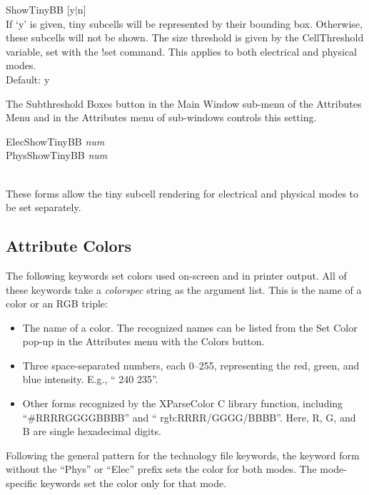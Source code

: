 \begin{description}
\item{\vt ShowTinyBB} [{\vt y}$|${\vt n}]\\
If `y' is given, tiny subcells will be represented by their bounding
box.  Otherwise, these subcells will not be shown.  The size threshold
is given by the {\et CellThreshold} variable, set with the {\cb !set}
command.  This applies to both electrical and physical modes.\\
Default: {\vt y}

The {\cb Subthreshold Boxes} button in the {\cb Main Window} sub-menu
of the {\cb Attributes Menu} and in the {\cb Attributes} menu of
sub-windows controls this setting.

\item\parbox[b]{4in}{\vt
ElecShowTinyBB {\it num}\\
PhysShowTinyBB {\it num}}\\
These forms allow the tiny subcell rendering for electrical and
physical modes to be set separately.
\end{description}


\subsection{Attribute Colors}
\label{attrcolor}

The following keywords set colors used on-screen and in printer
output.  All of these keywords take a {\it colorspec} string as the
argument list.  This is the name of a color or an RGB triple:

\begin{itemize}
\item{The name of a color.  The recognized names can be listed from
   the {\cb Set Color} pop-up in the {\cb Attributes} menu with the
   {\cb Colors} button.}
\item{Three space-separated numbers, each 0--255, representing the
   red, green, and blue intensity.  E.g., ``{ 240 235}''.}
\item{Other forms recognized by the {\vt XParseColor} C library
   function, including\\ ``{\vt \#RRRRGGGGBBBB}'' and ``{\vt
   rgb:RRRR/GGGG/BBBB}''.  Here, {\vt R}, {\vt G}, and {\vt B} are
   single hexadecimal digits.}
\end{itemize}

Following the general pattern for the technology file keywords, the
keyword form without the ``Phys'' or ``Elec'' prefix sets the color
for both modes.  The mode-specific keywords set the color only for
that mode.

